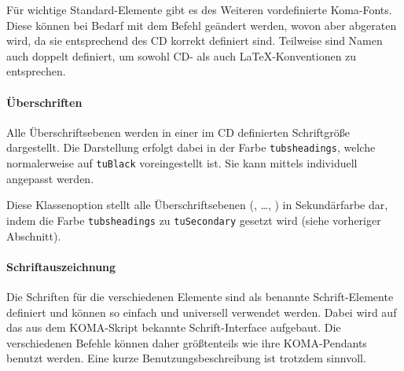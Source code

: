 Für wichtige Standard-Elemente gibt es des Weiteren vordefinierte Koma-Fonts.
Diese können bei Bedarf mit dem Befehl  
geändert werden, wovon aber abgeraten wird, da sie entsprechend des CD korrekt
definiert sind. Teilweise sind Namen auch doppelt definiert, um sowohl
CD- als auch \LaTeX-Konventionen zu entsprechen.

\paragraph{Überschriften}
Alle Überschriftsebenen werden in einer im CD definierten
Schriftgröße dargestellt.
Die Darstellung erfolgt dabei in der Farbe \lstinline{tubsheadings},
welche normalerweise auf \lstinline{tuBlack} voreingestellt ist.
Sie kann mittels
 individuell
angepasst werden.

\begin{Declaration}
\end{Declaration}

Diese Klassenoption stellt alle Überschriftsebenen
(, \ldots, )
in Sekundärfarbe dar, indem die Farbe \lstinline{tubsheadings} zu
\lstinline{tuSecondary} gesetzt wird (siehe vorheriger Abschnitt).

\paragraph{Schriftauszeichnung}
\begin{sloppypar}
Die Schriften für die verschiedenen Elemente sind als benannte Schrift-Elemente
definiert und können so einfach und universell verwendet werden.
Dabei wird auf das aus dem KOMA-Skript\cite{koma-skript} bekannte Schrift-Interface
aufgebaut. Die verschiedenen Befehle können daher größtenteils wie ihre KOMA-Pendants
benutzt werden. Eine kurze Benutzungsbeschreibung ist trotzdem sinnvoll.
\end{sloppypar}

\begin{Declaration}
  \\
  \\
\end{Declaration}

